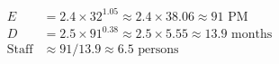 \begin{formulas}
\begin{align*}
E &= 2.4 \times 32^{1.05} \approx 2.4 \times 38.06 \approx 91 \text{ PM}\\
D &= 2.5 \times 91^{0.38} \approx 2.5 \times 5.55 \approx 13.9 \text{ months}\\
\text{Staff} &\approx 91 / 13.9 \approx 6.5 \text{ persons}
\end{align*}
\end{formulas}
